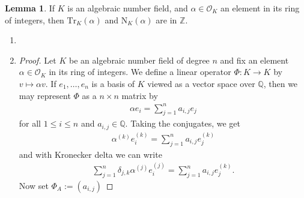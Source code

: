 \documentclass[a4paper]{book}
\theoremstyle{definition}
\newtheorem{lemma}[definition]{Lemma}
\begin{document}
\begin{thmbox}
    \begin{lemma}
        If \(K\) is an algebraic number field, and \(\alpha \in \mathcal{O}_K\) an element in its ring of integers, then \(\mathrm{Tr}_K(\alpha)\) and \(\mathrm{N}_K(\alpha)\) are in \(\mathbb{Z}\).
    \end{lemma}
\end{thmbox}
\begin{enumerate}
    \item 
    \item \begin{proof}
        Let \(K\) be an algebraic number field of degree \(n\) and fix an element \(\alpha \in \mathcal{O}_K\) in its ring of integers. We define a linear operator \(\Phi: K \longrightarrow K\) by \(v \mapsto \alpha v\). If \(e_1, \ldots, e_n\) is a basis of \(K\) viewed as a vector space over \(\mathbb{Q}\), then we may represent \(\Phi\) as a \(n \times n\) matrix by
        \begin{align*}
            \alpha e_i = \sum_{j=1}^n a_{i, j} e_j
        \end{align*}
        for all \(1 \leq i \leq n\) and \(a_{i, j} \in \mathbb{Q}\). Taking the conjugates, we get
        \begin{align*}
            \alpha^{(k)} e_i^{(k)} = \sum_{j=1}^n a_{i, j} e_j^{(k)}
        \end{align*}
        and with Kronecker delta we can write
        \begin{align*}
            \sum_{j=1}^n \delta_{j, k} \alpha^{(j)} e_i^{(j)} = \sum_{j=1}^n a_{i, j} e_j^{(k)} \text{.}
        \end{align*}
        Now set \(\Phi_A := (a_{i, j})\)
    \end{proof}
\end{enumerate}
\end{document}
